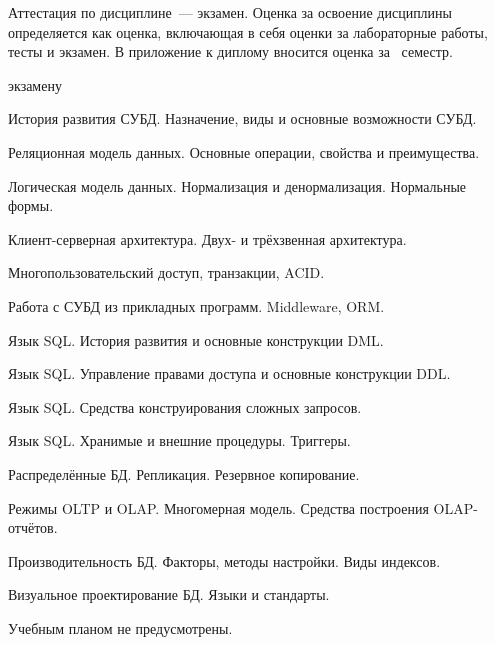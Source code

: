 \documentclass[a4paper]{article}
\begin{document}
\begin{CourseMarkCriteria}
\end{CourseMarkCriteria}

Аттестация по дисциплине~— экзамен.
Оценка за освоение дисциплины определяется как оценка, включающая в себя оценки за лабораторные работы, тесты и экзамен.
В приложение к диплому вносится оценка за \CourseExamSemester\ семестр.

\begin{CourseControlQuestions}{экзамену}
\item История развития СУБД. Назначение, виды и основные возможности СУБД.
\item Реляционная модель данных. Основные операции, свойства и преимущества.
\item Логическая модель данных. Нормализация и денормализация. Нормальные формы.
\item Клиент-серверная архитектура. Двух- и трёхзвенная архитектура.
\item Многопользовательский доступ, транзакции, ACID.
\item Работа с СУБД из прикладных программ. Middleware, ORM.
\item Язык SQL. История развития и основные конструкции DML.
\item Язык SQL. Управление правами доступа и основные конструкции DDL.
\item Язык SQL. Средства конструирования сложных запросов.
\item Язык SQL. Хранимые и внешние процедуры. Триггеры.
\item Распределённые БД. Репликация. Резервное копирование.
\item Режимы OLTP и OLAP. Многомерная модель. Средства построения OLAP-отчётов.
\item Производительность БД. Факторы, методы настройки. Виды индексов.
\item Визуальное проектирование БД. Языки и стандарты.
\end{CourseControlQuestions}

\CourseWorksSection

Учебным планом не предусмотрены.

\CourseLiteratureSection
\end{document}

